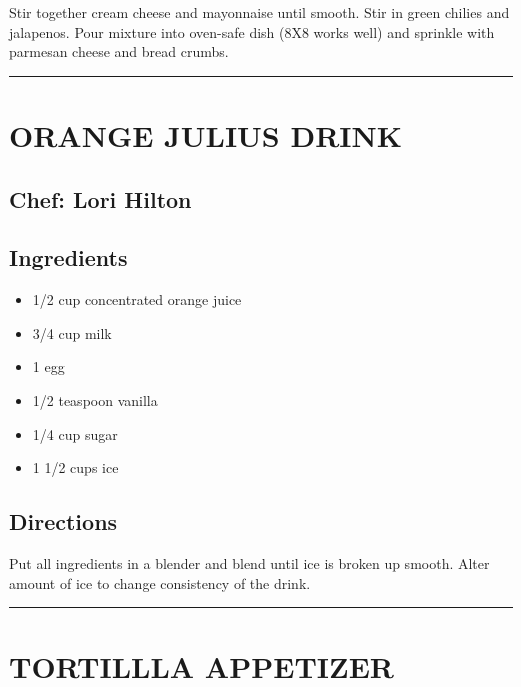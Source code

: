 \documentclass[
]{book}
\providecommand{\tightlist}{%
  \setlength{\itemsep}{0pt}\setlength{\parskip}{0pt}}
\begin{document}
Stir together cream cheese and mayonnaise until smooth. Stir in green chilies and jalapenos. Pour mixture into oven-safe dish (8X8 works well) and sprinkle with parmesan cheese and bread crumbs.

\begin{center}\rule{0.5\linewidth}{0.5pt}\end{center}

\hypertarget{orange-julius-drink}{%
\section*{ORANGE JULIUS DRINK}\label{orange-julius-drink}}


\hypertarget{chef-lori-hilton}{%
\subsection*{Chef: Lori Hilton}\label{chef-lori-hilton}}


\hypertarget{ingredients-9}{%
\subsection*{Ingredients}\label{ingredients-9}}


\begin{itemize}
\tightlist
\item
  1/2 cup concentrated orange juice
\item
  3/4 cup milk
\item
  1 egg
\item
  1/2 teaspoon vanilla
\item
  1/4 cup sugar
\item
  1 1/2 cups ice
\end{itemize}

\hypertarget{directions-9}{%
\subsection*{Directions}\label{directions-9}}


Put all ingredients in a blender and blend until ice is broken up smooth.
Alter amount of ice to change consistency of the drink.

\begin{center}\rule{0.5\linewidth}{0.5pt}\end{center}

\hypertarget{tortillla-appetizer}{%
\section*{TORTILLLA APPETIZER}\label{tortillla-appetizer}}
\end{document}
